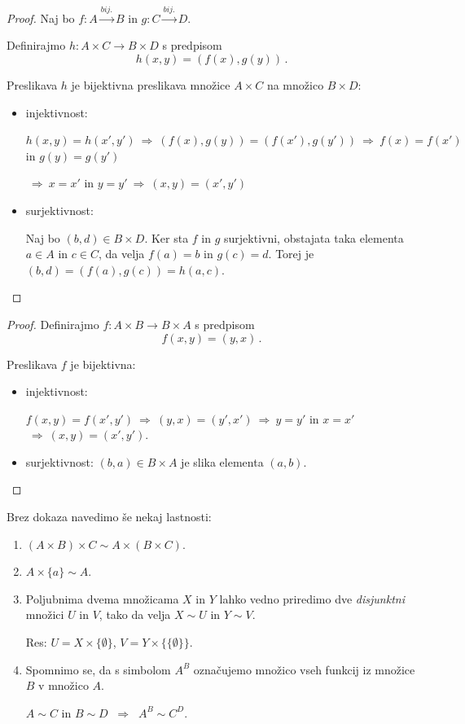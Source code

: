 \documentclass[11pt,paper=b5,footinclude,headinclude]{scrbook} %
\def\sledi {{~\Rightarrow~}}
\begin{document}
\begin{proof} Naj bo $f:A\overset{bij.}{\to}B$ in $g:C\overset{bij.}{\to}D$.

Definirajmo $h:A\times C\to B \times D$ s predpisom
$$h(x,y) = (f(x),g(y))\,.$$

Preslikava $h$ je bijektivna preslikava množice $A\times C$ na množico $B\times D$:
\begin{itemize}
  \item injektivnost:

  $h(x,y) = h(x',y')\sledi
  (f(x),g(y)) = (f(x'),g(y')) \sledi f(x) = f(x')$ in $g(y) = g(y')$

  $\sledi x = x'$ in $y = y' \sledi (x,y) = (x',y')$
  \item surjektivnost:

  Naj bo $(b,d)\in B\times D$. Ker sta $f$ in $g$ surjektivni, obstajata taka elementa $a\in A$
  in $c\in C$, da velja $f(a) = b$ in $g(c) = d$. Torej je $(b,d) = (f(a),g(c)) = h(a,c)$.
\end{itemize}
\end{proof}

\bigskip

\newpage
{}


\begin{proof} Definirajmo  $f:A\times B\to B\times A$ s predpisom
$$f(x,y) = (y,x)\,.$$

Preslikava $f$ je bijektivna:
\begin{itemize}
  \item injektivnost:

  $f(x,y) = f(x',y') \sledi (y,x) = (y',x') \sledi y = y'$ in $x = x'$ $\sledi (x,y) = (x',y')$.

  \item surjektivnost: $(b,a)\in B\times A$ je slika elementa $(a,b)$.
\end{itemize}
\end{proof}

Brez dokaza navedimo še nekaj lastnosti:
\begin{enumerate}
  \item $(A\times B)\times C\sim A\times (B\times C)$.
  \item $A\times \{a\}\sim A$.
  \item Poljubnima dvema množicama $X$ in $Y$ lahko vedno priredimo dve {\em disjunktni} množici
  $U$ in $V$, tako da velja $X\sim U$ in $Y\sim V$.

  Res: $U = X\times\{\emptyset\}$, $V = Y\times\{\{\emptyset\}\}$.
  \item Spomnimo se, da s simbolom $A^B$ označujemo množico vseh funkcij iz množice $B$ v množico $A$.

  $A\sim C$ in $B\sim D$ $\sledi$ $A^B\sim C^D$.
\end{enumerate}
\end{document}
